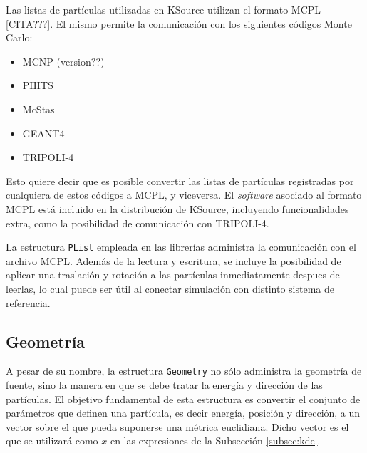 Las listas de partículas utilizadas en KSource utilizan el formato MCPL [CITA???]. El mismo permite la comunicación con los siguientes códigos Monte Carlo:
\begin{itemize}
	\item MCNP (version??)
	\item PHITS
	\item McStas
	\item GEANT4
	\item TRIPOLI-4
\end{itemize}
Esto quiere decir que es posible convertir las listas de partículas registradas por cualquiera de estos códigos a MCPL, y viceversa. El \emph{software} asociado al formato MCPL está incluido en la distribución de KSource, incluyendo funcionalidades extra, como la posibilidad de comunicación con TRIPOLI-4.

La estructura \verb|PList| empleada en las librerías administra la comunicación con el archivo MCPL. Además de la lectura y escritura, se incluye la posibilidad de aplicar una traslación y rotación a las partículas inmediatamente despues de leerlas, lo cual puede ser útil al conectar simulación con distinto sistema de referencia.

\subsection{Geometría}

A pesar de su nombre, la estructura \verb|Geometry| no sólo administra la geometría de fuente, sino la manera en que se debe tratar la energía y dirección de las partículas. El objetivo fundamental de esta estructura es convertir el conjunto de parámetros que definen una partícula, es decir energía, posición y dirección, a un vector sobre el que pueda suponerse una métrica euclidiana. Dicho vector es el que se utilizará como $x$ en las expresiones de la Subsección \ref{subsec:kde}.

